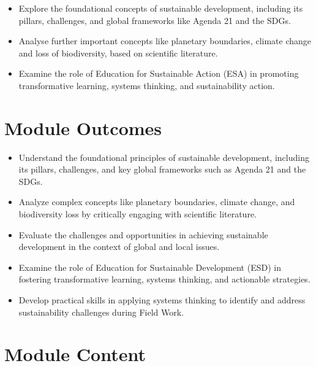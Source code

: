 \documentclass[
  letterpaper,
  10pt,
  openany]{book}
\providecommand{\tightlist}{%
  \setlength{\itemsep}{0pt}\setlength{\parskip}{0pt}}\usepackage{longtable,booktabs,array}
\begin{document}

\begin{itemize}
\tightlist
\item
  Explore the foundational concepts of sustainable development,
  including its pillars, challenges, and global frameworks like Agenda
  21 and the SDGs.
\item
  Analyse further important concepts like planetary boundaries, climate
  change and loss of biodiversity, based on scientific literature.
\item
  Examine the role of Education for Sustainable Action (ESA) in
  promoting transformative learning, systems thinking, and
  sustainability action.
\end{itemize}

\section*{Module Outcomes}\label{module-outcomes}


\begin{itemize}
\tightlist
\item
  Understand the foundational principles of sustainable development,
  including its pillars, challenges, and key global frameworks such as
  Agenda 21 and the SDGs.
\item
  Analyze complex concepts like planetary boundaries, climate change,
  and biodiversity loss by critically engaging with scientific
  literature.
\item
  Evaluate the challenges and opportunities in achieving sustainable
  development in the context of global and local issues.
\item
  Examine the role of Education for Sustainable Development (ESD) in
  fostering transformative learning, systems thinking, and actionable
  strategies.
\item
  Develop practical skills in applying systems thinking to identify and
  address sustainability challenges during Field Work.
\end{itemize}

\section*{Module Content}\label{module-content-1}

\end{document}
